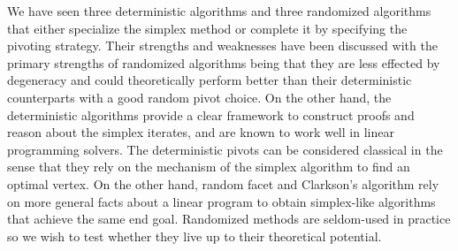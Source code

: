 \documentclass{standalone}
\begin{document}
We have seen three deterministic algorithms and three randomized algorithms that either specialize the simplex method or complete it by specifying the pivoting strategy. Their strengths and weaknesses have been discussed with the primary strengths of randomized algorithms being that they are less effected by degeneracy and could theoretically perform better than their deterministic counterparts with a good random pivot choice. On the other hand, the deterministic algorithms provide a clear framework to construct proofs and reason about the simplex iterates, and are known to work well in linear programming solvers. The deterministic pivots can be considered classical in the sense that they rely on the mechanism of the simplex algorithm to find an optimal vertex. On the other hand, random facet and Clarkson's algorithm rely on more general facts about a linear program to obtain simplex-like algorithms that achieve the same end goal. Randomized methods are seldom-used in practice so we wish to test whether they live up to their theoretical potential.
\end{document}
